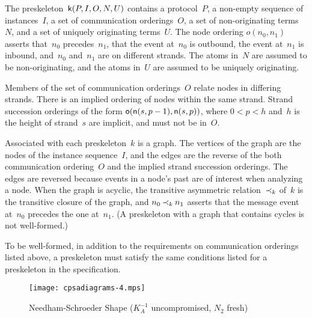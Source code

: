 \documentclass[12pt]{report}
\theoremstyle{definition}
\begin{document}
The preskeleton~$\operatorname{\mathsf{k}}(P,I,O,N,U)$ contains a
protocol~$P$, a non-empty sequence of instances~$I$, a set of
communication orderings~$O$, a set of non-originating
terms~$N$, and a set of uniquely
originating terms~$U$.  The node
ordering $o(n_0, n_1)$
asserts that~$n_0$ precedes~$n_1$, that the event at~$n_0$ is
outbound, the event at~$n_1$ is inbound, and~$n_0$ and~$n_1$
are on different strands.  The atoms in~$N$ are assumed to be
non-originating, and the atoms in~$U$ are assumed to be uniquely
originating.

Members of the set of communication orderings~$O$ relate nodes in
differing strands.  There is an implied ordering of nodes within the
same strand.  Strand succession orderings of the form
$\operatorname{\mathsf{o}}(\operatorname{\mathsf{n}}(s, p-1), \operatorname{\mathsf{n}}(s, p))$, where $0 < p < h$ and~$h$ is
the height of strand~$s$ are implicit, and must not be in~$O$.

Associated with each preskeleton~$k$ is a graph.  The vertices of the
graph are the nodes of the instance sequence~$I$, and the edges are
the reverse of the both communication ordering~$O$ and the implied
strand succession orderings.  The edges are reversed because events in
a node's past are of interest when analyzing a node.  When the graph
is acyclic, the transitive asymmetric relation~$\mathbin{\prec_{k}}$ of~$k$ is the
transitive closure of the graph, and $n_0\mathbin{\prec_{k}} n_1$ asserts that the
message event at~$n_0$ precedes the one at~$n_1$.  (A preskeleton with
a graph that contains cycles is not well-formed.)

To be well-formed, in addition to the
requirements on communication orderings listed above, a preskeleton
must satisfy the same conditions listed for a preskeleton in the
specification.

\begin{figure}
\begin{center}
\texttt{[image: cpsadiagrams-4.mps]}
\caption{Needham-Schroeder Shape ($K^{-1}_A$ uncompromised, $N_2$ fresh)}
\label{fig:ns shape}
\end{center}
\end{figure}
\end{document}
